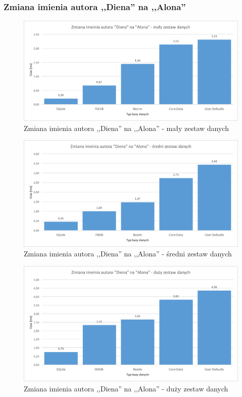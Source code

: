 \subsubsection{Zmiana imienia autora ,,Diena'' na ,,Alona''}

\begin{figure}[H]
    \centering\includegraphics[width=\linewidth]{img/update_data/update_author/update_author_small_test.png}
    \caption{Zmiana imienia autora ,,Diena'' na ,,Alona'' - mały zestaw danych}
    \label{img: update-by-author-small}
\end{figure}

\begin{figure}[H]
    \centering\includegraphics[width=\linewidth]{img/update_data/update_author/update_author_medium_test.png}
    \caption{Zmiana imienia autora ,,Diena'' na ,,Alona'' - średni zestaw danych}
    \label{img: update-by-author-medium}
\end{figure}

\begin{figure}[H]
    \centering\includegraphics[width=\linewidth]{img/update_data/update_author/update_author_big_test.png}
    \caption{Zmiana imienia autora ,,Diena'' na ,,Alona'' - duży zestaw danych}
    \label{img: update-by-author-big}
\end{figure}

